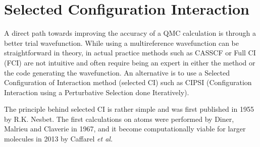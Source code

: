 \chapter{Selected Configuration Interaction}
\label{chap:sCI}
A direct path towards improving the accuracy of a QMC calculation is through a better trial wavefunction.
While using a multireference wavefunction can be straightforward in theory, in actual practice methods such as CASSCF or Full CI (FCI) are not intuitive and often require being an expert in either the method or the code generating the wavefunction.
An alternative is to use a Selected Configuration of Interaction method (selected CI) such as CIPSI (Configuration Interaction using a Perturbative Selection done Iteratively).

The principle behind selected CI is rather simple and was first published in 1955 by R.K. Nesbet\cite{Nesbet1955}.
The first calculations on atoms were performed by Diner, Malrieu and Claverie\cite{Diner1967} in 1967, and it become computationally viable for larger molecules in 2013 by Caffarel \textit{et al.}\cite{Caffarel2013}  
% 
% 

